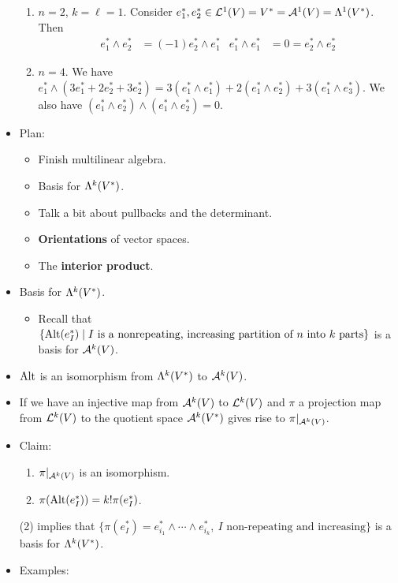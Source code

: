 \documentclass[../notes.tex]{subfiles}
\begin{document}
\begin{itemize}
\begin{enumerate}
        \item $n=2$, $k=\ell=1$. Consider $e_1^*,e_2^*\in\lin[1]{V}=V^*=\alt[1]{V}=\lam[1]{V^*}$. Then
        \begin{align*}
            e_1^*\wedge e_2^* &= (-1)e_2^*\wedge e_1^*&
            e_1^*\wedge e_1^* &= 0 = e_2^*\wedge e_2^*
        \end{align*}
        \item $n=4$. We have $e_1^*\wedge(3e_1^*+2e_2^*+3e_2^*)=3(e_1^*\wedge e_1^*)+2(e_1^*\wedge e_2^*)+3(e_1^*\wedge e_3^*)$. We also have $(e_1^*\wedge e_2^*)\wedge(e_1^*\wedge e_2^*)=0$.
    \end{enumerate}
    \item {}Plan:
    \begin{itemize}
        \item Finish multilinear algebra.
        \item Basis for $\lam[k]{V^*}$.
        \item Talk a bit about pullbacks and the determinant.
        \item \textbf{Orientations} of vector spaces.
        \item The \textbf{interior product}.
    \end{itemize}
    \item Basis for $\lam[k]{V^*}$.
    \begin{itemize}
        \item Recall that $\{\Alt(e_I^*)\mid I\text{ is a nonrepeating, increasing partition of $n$ into $k$ parts}\}$ is a basis for $\alt[k]{V}$.
    \end{itemize}
    \item $\Alt$ is an isomorphism from $\lam[k]{V^*}$ to $\alt[k]{V}$.
    \item If we have an injective map from $\alt[k]{V}$ to $\lin[k]{V}$ and $\pi$ a projection map from $\lin[k]{V}$ to the quotient space $\alt[k]{V^*}$ gives rise to $\pi|_{\alt[k]{V}}$.
    \item Claim:
    \begin{enumerate}
        \item $\pi|_{\alt[k]{V}}$ is an isomorphism.
        \item $\pi(\Alt(e_I^*))=k!\pi(e_I^*)$.
    \end{enumerate}
    (2) implies that $\{\pi(e_I^*)=e_{i_1}^*\wedge\cdots\wedge e_{i_k}^*,\ I\text{ non-repeating and increasing}\}$ is a basis for $\lam[k]{V^*}$.
    \item Examples:
    \begin{enumerate}

\end{enumerate}
\end{itemize}
\end{document}
